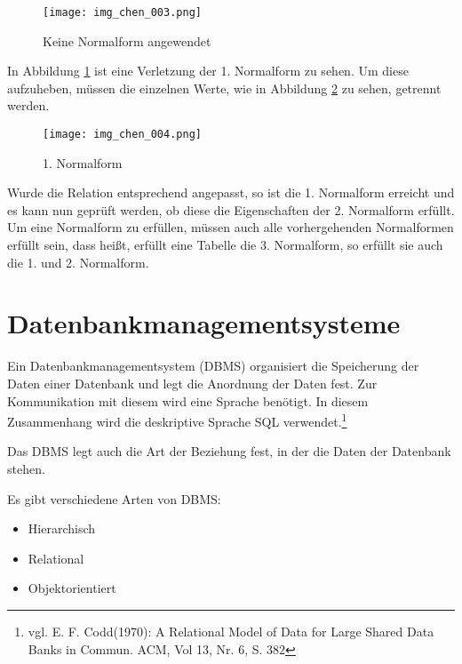 \begin{figure}[H]
\begin{center}
\texttt{[image: img\_chen\_003.png]}
\caption{Keine Normalform angewendet}
\label{chenpic4}
\end{center}
\end{figure}



In Abbildung \ref{chenpic4} ist eine Verletzung der 1. Normalform zu sehen. Um diese aufzuheben, müssen die einzelnen Werte, wie in Abbildung \ref{chenpic5} zu sehen, getrennt werden.

\begin{figure}[H]
\begin{center}
\texttt{[image: img\_chen\_004.png]}
\caption{1. Normalform}
\label{chenpic5}
\end{center}
\end{figure}

Wurde die Relation entsprechend angepasst, so ist die 1. Normalform erreicht und es kann nun geprüft werden,
ob diese die Eigenschaften der 2. Normalform erfüllt.
Um eine Normalform zu erfüllen, müssen auch alle vorhergehenden Normalformen erfüllt sein, dass heißt, erfüllt eine Tabelle die 3. Normalform, so erfüllt sie auch die 1. und 2. Normalform.


\section{Datenbankmanagementsysteme}
\label{sec:dbms}

Ein Datenbankmanagementsystem (DBMS) organisiert die Speicherung der Daten einer Datenbank und legt die Anordnung der Daten fest.
Zur Kommunikation mit diesem wird eine Sprache benötigt. In diesem Zusammenhang wird die deskriptive Sprache SQL verwendet.\footnote{vgl. E. F. Codd(1970): A Relational Model of Data for Large Shared Data Banks in Commun. ACM, Vol 13, Nr. 6, S. 382}

Das DBMS legt auch die Art der Beziehung fest, in der die Daten der Datenbank stehen.

Es gibt verschiedene Arten von DBMS:

\begin{itemize}
\item Hierarchisch
\item Relational
\item Objektorientiert
\end{itemize}

